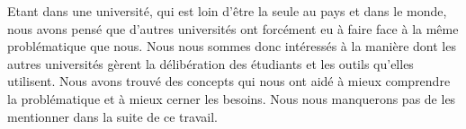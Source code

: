 Etant dans une université, qui est loin d'être la seule
au pays et dans le monde, nous avons pensé que d'autres universités
ont forcément eu à faire face à la même problématique que nous.
Nous nous sommes donc intéressés à la manière dont les autres universités
gèrent la délibération des étudiants et les outils qu'elles utilisent.
Nous avons trouvé des concepts qui nous ont aidé à mieux
comprendre la problématique et à mieux cerner les besoins.
Nous nous manquerons pas de les mentionner dans la suite de ce travail.
